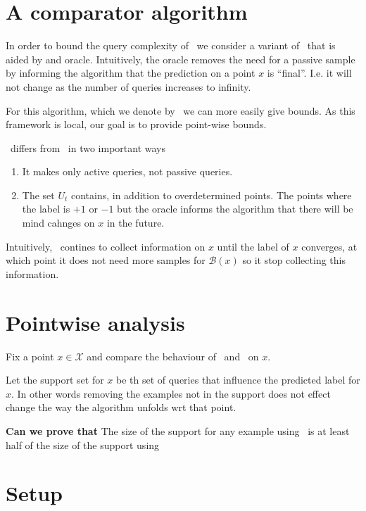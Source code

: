 \documentclass{article}
\def\X{{\mathcal X}}
\def\B{{\mathcal B}}
\begin{document}
  \section{A comparator algorithm}
  In order to bound the query complexity of \ANNB\ we consider a
  variant of \ANNB\ that is aided by and oracle. Intuitively, the
  oracle removes the need for a passive sample by informing the
  algorithm that the prediction on a point $x$ is ``final''. I.e. it
  will not change as the number of queries increases to infinity.

  For this algorithm, which we denote by \ONNB\, we can more easily
  give bounds. As this framework is local, our goal is to provide
  point-wise bounds.

  \ONNB\ differs from \ANNB\ in two important ways
  \begin{enumerate}
  \item It makes only active queries, not passive queries.
  \item The set $U_t$ contains, in addition to overdetermined
    points. The points where the label is $+1$ or $-1$ but the oracle
    informs the algorithm that there will be mind cahnges on $x$ in
    the future. 
  \end{enumerate}

  Intuitively, \ONNB\ contines to collect information on $x$ until the
  label of $x$ converges, at which point it does not need more
  samples for $\B(x)$ so it stop collecting this information.

  \section{Pointwise analysis}

  Fix a point $x \in \X$ and compare the behaviour of \NNB\ and \ONNB\
  on $x$.

  Let the support set for $x$ be th set of queries that influence the predicted label for $x$. In other words removing the examples not in the support does not effect change the way the algorithm unfolds wrt that point.

  {\bf Can we prove that } The size of the support for any example using \ONNB\ is at least half of the size of the support using \ANNB\
    
\pagebreak

\section{Setup}
\end{document}
